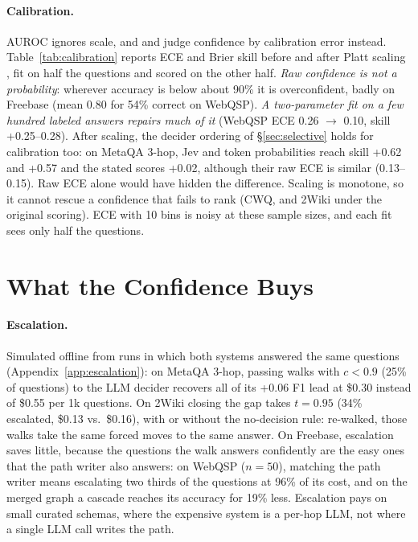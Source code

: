 \documentclass[11pt]{article}
\begin{document}
\paragraph{Calibration.} AUROC ignores scale, and \citet{tian2023just} and
\citet{kim2026same} judge confidence by calibration error instead.
Table~\ref{tab:calibration} reports ECE and Brier skill before and after Platt scaling
\citep{platt1999,guo2017calibration}, fit on half the questions and scored on the other
half. \emph{Raw confidence is not a probability}: wherever accuracy is below about 90\%
it is overconfident, badly on Freebase (mean 0.80 for 54\% correct on WebQSP). \emph{A
two-parameter fit on a few hundred labeled answers repairs much of it} (WebQSP ECE 0.26
$\to$ 0.10, skill +0.25--0.28). After scaling, the decider ordering of
\S\ref{sec:selective} holds for calibration too: on MetaQA 3-hop, Jev and token
probabilities reach skill +0.62 and +0.57 and the stated scores +0.02, although their
raw ECE is similar (0.13--0.15). Raw ECE alone would have hidden the difference.
Scaling is monotone, so it cannot rescue a confidence that fails to rank (CWQ, and 2Wiki
under the original scoring). ECE with 10 bins
is noisy at these sample sizes, and each fit sees only half the questions.

\section{What the Confidence Buys}
\label{sec:use}

\paragraph{Escalation.} Simulated offline from runs in which both systems answered the
same questions (Appendix~\ref{app:escalation}): on MetaQA 3-hop, passing walks with
$c < 0.9$ (25\% of questions) to the LLM decider recovers all of its +0.06 F1 lead at
\$0.30 instead of \$0.55 per 1k questions. On 2Wiki closing the gap takes $t=0.95$ (34\% escalated, \$0.13
vs.\ \$0.16), with or without the no-decision rule: re-walked, those walks take the
same forced moves to the same answer. On Freebase,
escalation saves little, because the questions the walk answers confidently are the easy
ones that the path writer also answers: on WebQSP ($n=50$), matching the path writer
means escalating two thirds of the questions at 96\% of its cost, and on the merged
graph a cascade reaches its accuracy for 19\% less. Escalation pays on small curated
schemas, where the expensive system is a per-hop LLM, not where a single LLM call writes
the path.
\end{document}
